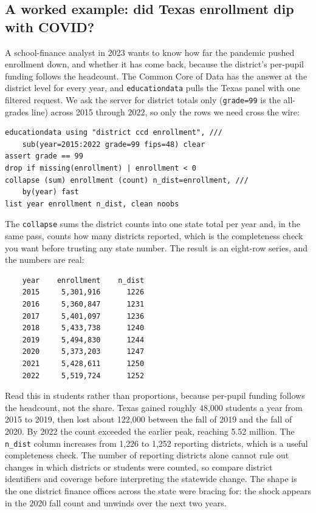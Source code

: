 \subsection{A worked example: did Texas enrollment dip with COVID?}\label{sec:ccd}
A school-finance analyst in 2023 wants to know how far the pandemic pushed enrollment down, and whether it has come back, because the district's per-pupil funding follows the headcount. The Common Core of Data has the answer at the district level for every year, and \texttt{educationdata} pulls the Texas panel with one filtered request. We ask the server for district totals only (\texttt{grade=99} is the all-grades line) across 2015 through 2022, so only the rows we need cross the wire:
\par
{\footnotesize
\begin{verbatim}
educationdata using "district ccd enrollment", ///
    sub(year=2015:2022 grade=99 fips=48) clear
assert grade == 99
drop if missing(enrollment) | enrollment < 0
collapse (sum) enrollment (count) n_dist=enrollment, ///
    by(year) fast
list year enrollment n_dist, clean noobs
\end{verbatim}
}
The \texttt{collapse} sums the district counts into one state total per year and, in the same pass, counts how many districts reported, which is the completeness check you want before trusting any state number. The result is an eight-row series, and the numbers are real:
\par
{\footnotesize
\begin{verbatim}
    year    enrollment    n_dist
    2015     5,301,916      1226
    2016     5,360,847      1231
    2017     5,401,097      1236
    2018     5,433,738      1240
    2019     5,494,830      1244
    2020     5,373,203      1247
    2021     5,428,611      1250
    2022     5,519,724      1252
\end{verbatim}
}
Read this in students rather than proportions, because per-pupil funding follows the headcount, not the share. Texas gained roughly 48{,}000 students a year from 2015 to 2019, then lost about 122{,}000 between the fall of 2019 and the fall of 2020. By 2022 the count exceeded the earlier peak, reaching 5.52 million. The \texttt{n\_dist} column increases from 1{,}226 to 1{,}252 reporting districts, which is a useful completeness check. The number of reporting districts alone cannot rule out changes in which districts or students were counted, so compare district identifiers and coverage before interpreting the statewide change. The shape is the one district finance offices across the state were bracing for: the shock appears in the 2020 fall count and unwinds over the next two years.


